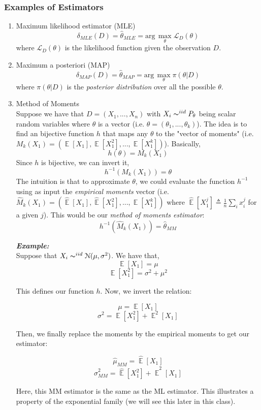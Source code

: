 \documentclass[12pt]{report}
\DeclareMathOperator{\E}{\mathbb{E}}
\begin{document}
\subsubsection{Examples of Estimators}
\begin{enumerate}
\item Maximum likelihood estimator (MLE)
$$\delta_{MLE}(D)= \hat{\theta}_{MLE} = \text{arg}\,\max\limits_{\theta} \mathcal{L}_D(\theta)$$
where $\mathcal{L}_D(\theta)$ is the likelihood function given the observation $D$.
\item Maximum a posteriori (MAP)
$$\delta_{MAP}(D)= \hat{\theta}_{MAP} = \text{arg}\,\max\limits_{\theta} \pi(\theta|D)$$
where $\pi(\theta|D)$ is the \textit{posterior distribution} over all the possible $\theta$. 
\item Method of Moments\\
Suppose we have that $D = (X_1,...,X_n)$ with $X_i \thicksim^{iid} P_\theta$ being scalar random variables where $\theta$ is a vector (i.e. $\theta = (\theta_1,...,\theta_k)$). 
The idea is to find an bijective function $h$ that maps any $\theta$ to  the "vector of moments" (i.e. $M_k(X_1)=(\E[X_1],\E[X_1^2],...,\E[X_1^k])$). Basically,
$$h(\theta)=M_k(X_1)$$
Since $h$ is bijective, we can invert it,
$$h^{-1}(M_k(X_1)) = \theta$$
The intuition is that to approximate $\theta$, we could evaluate the function $h^{-1}$ using as input the \textit{empirical moments} vector (i.e. $\hat{M}_k(X_1)= (\hat{\E}[X_1],\hat{\E}[X_1^2],...,\hat{\E}[X_1^k])$ where $\hat{\E}[X_1^j] \triangleq \frac{1}{n}\sum_{i}x_i^j$ for a given $j$). This would be our \textit{method of moments estimator}:
$$h^{-1}(\hat{M}_k(X_1)) = \hat{\theta}_{MM}$$

\textbf{\textit{Example:}}\\
Suppose that $X_i \thicksim^{iid} \mathcal{N}(\mu,\sigma^2)$. We have that,
$$\E[X_1]=\mu$$
$$\E[X_1^2]=\sigma^2+\mu^2$$

This defines our function $h$. Now, we invert the relation:

$$\mu = \E[X_1]$$
$$\sigma^2 = \E[X_1^2] + \E^2[X_1]$$

Then, we finally replace the moments by the empirical moments to get our estimator:

$$\hat{\mu}_{MM} = \hat{\E}[X_1]$$
$$\hat{\sigma}^2_{MM} = \hat{\E}[X_1^2] + \hat{\E}^2[X_1]$$

Here, this MM estimator is the same as the ML estimator. This illustrates a property of the exponential family (we will see this later in this class).


\end{enumerate}
\end{document}

